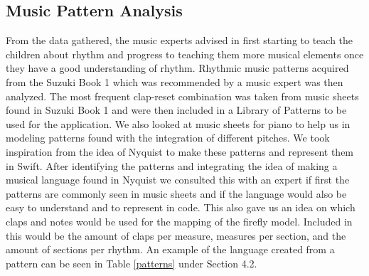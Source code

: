 \subsection{Music Pattern Analysis}
From the data gathered, the music experts advised in first starting to teach the children about rhythm and progress to teaching them more musical elements once they have a good understanding of rhythm. Rhythmic music patterns acquired from the Suzuki Book 1 which was recommended by a music expert was then analyzed. The most frequent clap-reset combination was taken from music sheets found in Suzuki Book 1 and  were then included in a Library of Patterns to be used for the application. We also looked at music sheets for piano to help us in modeling patterns found with the integration of different pitches. We took inspiration from the idea of Nyquist \cite{dannenberg1997machine} to make these patterns and represent them in Swift. After identifying the patterns and integrating the idea of making a musical language found in Nyquist we consulted this with an expert if first the patterns are commonly seen in music sheets and if the language would also be easy to understand and to represent in code. This also gave us an idea on which claps and notes would be used for the mapping of the firefly model. Included in this would be the amount of claps per measure, measures per section, and the amount of sections per rhythm. An example of the language created from a pattern can be seen in Table \ref{patterns} under Section 4.2. 

